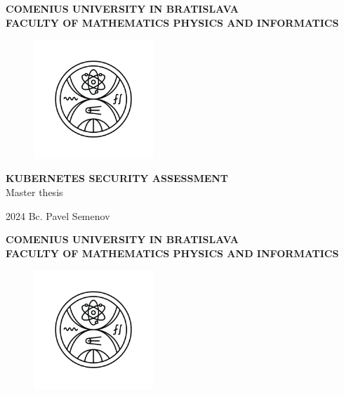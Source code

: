 \documentclass[12pt, oneside, openany]{book}
\def\mfrok{2024}
\def\mftitle{Kubernetes security assessment}
\def\mfthesistype{Master thesis}
\def\mfauthor{Bc. Pavel Semenov}
\def\mfuniversity{COMENIUS UNIVERSITY IN BRATISLAVA}
\def\mffaculty{FACULTY OF MATHEMATICS PHYSICS AND INFORMATICS}
\begin{document}
\frontmatter


\thispagestyle{empty}

\noindent
\begin{minipage}{\textwidth}
    \begin{center}
        \textbf{\mfuniversity \\
        \mffaculty}
    \end{center}
\end{minipage}

\vfill
\begin{figure}[!hbt]
	\begin{center}
		\includegraphics[width=0.4\textwidth]{images/FMFI_logo_BP.png}
		\label{img:logo}
	\end{center}
\end{figure}
\begin{center}
		\textbf{\MakeUppercase{\Large\mftitle}}\\
		\mfthesistype
\end{center}
\vfill
\mfrok \hfill
\mfauthor
\cleardoublepage



\thispagestyle{empty}
\noindent
\begin{minipage}{\textwidth}
    \begin{center}
        \textbf{\mfuniversity \\
        \mffaculty}
    \end{center}
\end{minipage}

\vfill
\begin{figure}[!hbt]
    \begin{center}
        \includegraphics[width=0.4\textwidth]{images/FMFI_logo_BP.png}
        \label{img:logo_dark}
    \end{center}
\end{figure}
\end{document}
